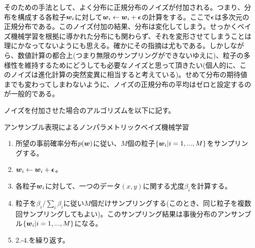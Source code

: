\documentclass[dvipdfmx, 9pt, a4paper]{jsarticle}
\newcommand{\bm}[1]{{\mbox{\boldmath $#1$}}}
\begin{document}
そのための手法として、よく分布に正規分布のノイズが付加される。つまり、分布を構成する各粒子$\bm w_i$に対して$\bm w_i \leftarrow \bm w_i + \bm \epsilon$の計算をする。ここで$\bm \epsilon$は多次元の正規分布である。このノイズ付加の結果、分布は変化してしまう。せっかくベイズ機械学習を根拠に導かれた分布にも関わらず、それを変形させてしまうことは理にかなってないようにも思える。確かにその指摘は尤もである。しかしながら、数値計算の都合上(つまり無限のサンプリングができないゆえに)、粒子の多様性を維持するためにどうしても必要なノイズと思って頂きたい(個人的に、このノイズは進化計算の突然変異に相当すると考えている)。せめて分布の期待値までも変わってしまわないように、ノイズの正規分布の平均はゼロと設定するのが一般的である。\par
ノイズを付加させた場合のアルゴリズムを以下に記す。\bigskip

\begin{itembox}[l]{アンサンブル表現によるノンパラメトリックベイズ機械学習}
\begin{enumerate}
\item 所望の事前確率分布$p(\bm w)$に従い、$M$個の粒子$\{ \bm w_i|i=1,...,M \}$をサンプリングする。
\item $\bm w_i \leftarrow \bm w_i + \bm \epsilon$。
\item 各粒子$\bm w_i$に対して、一つのデータ$(x, y)$に関する尤度$\beta_i$を計算する。
\item 粒子を$\beta_i/\sum_i \beta_i$に従い$M$個だけサンプリングする(このとき、同じ粒子を複数回サンプリングしてもよい)。このサンプリング結果は事後分布のアンサンブル$\{ \bm w_i|i=1,...,M \}$になる。
\item 2.-4.を繰り返す。
\end{enumerate}
\end{itembox}
\end{document}
